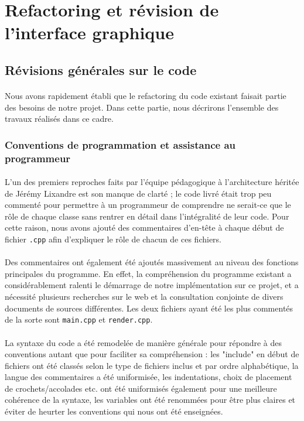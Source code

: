 \section{Refactoring et révision de l'interface graphique}

\subsection{Révisions générales sur le code}
\paragraph{}
Nous avons rapidement établi que le refactoring du code existant
faisait partie des besoins de notre projet. Dans cette partie, nous
décrirons l'ensemble des travaux réalisés dans ce cadre.

\subsubsection{Conventions de programmation et assistance au programmeur}
\paragraph{}
L'un des premiers reproches faits par l'équipe pédagogique à
l'architecture héritée de Jérémy Lixandre est son manque de clarté ;
le code livré était trop peu commenté pour permettre à un programmeur
de comprendre ne serait-ce que le rôle de chaque classe sans rentrer
en détail dans l'intégralité de leur code. Pour cette raison, nous
avons ajouté des commentaires d'en-tête à chaque début de fichier
\verb!.cpp! afin d'expliquer le rôle de chacun de ces fichiers.
\paragraph{}
Des commentaires ont également été ajoutés massivement au niveau des
fonctions principales du programme. En effet, la compréhension du
programme existant a considérablement ralenti le démarrage de notre
implémentation sur ce projet, et a nécessité plusieurs recherches sur
le web et la consultation conjointe de divers documents de sources
différentes. Les deux fichiers ayant été les plus commentés de la
sorte sont \verb!main.cpp! et \verb!render.cpp!.
\paragraph{}
La syntaxe du code a été remodelée de manière générale pour répondre à
des conventions autant que pour faciliter sa compréhension : les
"include" en début de fichiers ont été classés selon le type de
fichiers inclus et par ordre alphabétique, la langue des commentaires
a été uniformisée, les indentations, choix de placement de
crochets/accolades etc. ont été uniformisés également pour une
meilleure cohérence de la syntaxe, les variables ont été renommées
pour être plus claires et éviter de heurter les conventions qui nous
ont été enseignées.

